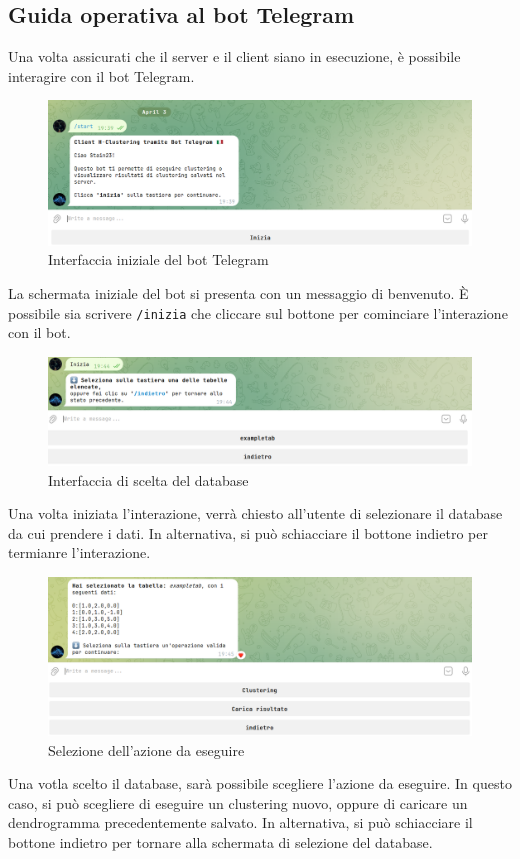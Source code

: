 \subsection{Guida operativa al bot Telegram}

Una volta assicurati che il server e il client siano in esecuzione, è possibile interagire con il bot Telegram.


\begin{figure}[h!]
    \centering
    \includegraphics[width=.5\textwidth]{images/tg iniziale.png}
    \caption{Interfaccia iniziale del bot Telegram}
\end{figure}

La schermata iniziale del bot si presenta con un messaggio di benvenuto. È possibile sia scrivere \texttt{/inizia} che cliccare sul bottone per cominciare l'interazione con il bot.

\begin{figure}[h!]
    \centering
    \includegraphics[width=.5\textwidth]{images/inizia tg.png}
    \caption{Interfaccia di scelta del database}
\end{figure}

Una volta iniziata l'interazione, verrà chiesto all'utente di selezionare il database da cui prendere i dati. In alternativa, si può schiacciare il bottone indietro per termianre l'interazione. 

\begin{figure}[h!]
    \centering
    \includegraphics[width=.5\textwidth]{images/tg schemrata clustering.png}
    \caption{Selezione dell'azione da eseguire}
\end{figure}

Una votla scelto il database, sarà possibile scegliere l'azione da eseguire. In questo caso, si può scegliere di eseguire un clustering nuovo, oppure di caricare un dendrogramma precedentemente salvato. In alternativa, si può schiacciare il bottone indietro per tornare alla schermata di selezione del database.

